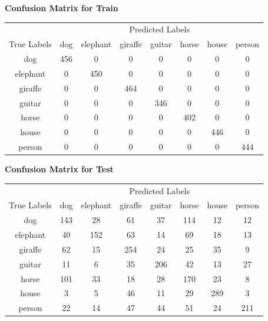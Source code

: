 \documentclass{article}
\begin{document}
\begin{center}
    \textbf{Confusion Matrix for Train}
    
    \begin{tabular}{c|ccccccc}
    \toprule
    & \multicolumn{7}{c}{Predicted Labels} \\
    \cmidrule(lr){2-8}
    True Labels & dog & elephant & giraffe & guitar & horse & house & person \\
    \midrule
    dog & 456 & 0 & 0 & 0 & 0 & 0 & 0 \\
    elephant & 0 & 450 & 0 & 0 & 0 & 0 & 0 \\
    giraffe & 0 & 0 & 464 & 0 & 0 & 0 & 0 \\
    guitar & 0 & 0 & 0 & 346 & 0 & 0 & 0 \\
    horse & 0 & 0 & 0 & 0 & 402 & 0 & 0 \\
    house & 0 & 0 & 0 & 0 & 0 & 446 & 0 \\
    person & 0 & 0 & 0 & 0 & 0 & 0 & 444 \\
    \bottomrule
    \end{tabular}
    \label{tab:confusion_matrix_train_aug}
\end{center}

\begin{center}
    \textbf{Confusion Matrix for Test}
    
    \begin{tabular}{c|ccccccc}
    \toprule
    & \multicolumn{7}{c}{Predicted Labels} \\
    \cmidrule(lr){2-8}
    True Labels & dog & elephant & giraffe & guitar & horse & house & person \\
    \midrule
    dog & 143 & 28 & 61 & 37 & 114 & 12 & 12 \\
    elephant & 40 & 152 & 63 & 14 & 69 & 18 & 13 \\
    giraffe & 62 & 15 & 254 & 24 & 25 & 35 & 9 \\
    guitar & 11 & 6 & 35 & 206 & 42 & 13 & 27 \\
    horse & 101 & 33 & 18 & 28 & 170 & 23 & 8 \\
    house & 3 & 5 & 46 & 11 & 29 & 289 & 3 \\
    person & 22 & 14 & 47 & 44 & 51 & 24 & 211 \\
    \bottomrule
    \end{tabular}
    \label{tab:confusion_matrix_test_aug}
\end{center}
\end{document}
